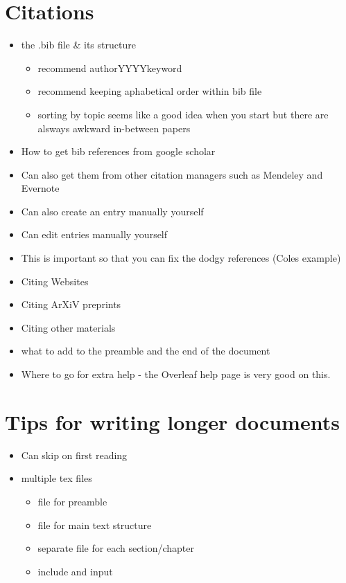 \documentclass[
]{book}
\providecommand{\tightlist}{%
  \setlength{\itemsep}{0pt}\setlength{\parskip}{0pt}}
\begin{document}
\hypertarget{citations}{%
\section{Citations}\label{citations}}

\begin{itemize}
\tightlist
\item
  the .bib file \& its structure

  \begin{itemize}
  \tightlist
  \item
    recommend authorYYYYkeyword
  \item
    recommend keeping aphabetical order within bib file
  \item
    sorting by topic seems like a good idea when you start but there are alsways awkward in-between papers
  \end{itemize}
\item
  How to get bib references from google scholar
\item
  Can also get them from other citation managers such as Mendeley and Evernote
\item
  Can also create an entry manually yourself
\item
  Can edit entries manually yourself
\item
  This is important so that you can fix the dodgy references (Coles example)
\item
  Citing Websites
\item
  Citing ArXiV preprints
\item
  Citing other materials
\item
  what to add to the preamble and the end of the document
\item
  Where to go for extra help - the Overleaf help page is very good on this.
\end{itemize}

\hypertarget{tips-for-writing-longer-documents}{%
\section{Tips for writing longer documents}\label{tips-for-writing-longer-documents}}

\begin{itemize}
\tightlist
\item
  Can skip on first reading
\item
  multiple tex files

  \begin{itemize}
  \tightlist
  \item
    file for preamble
  \item
    file for main text structure
  \item
    separate file for each section/chapter
  \item
    include and input
  \end{itemize}
\end{itemize}
\end{document}
